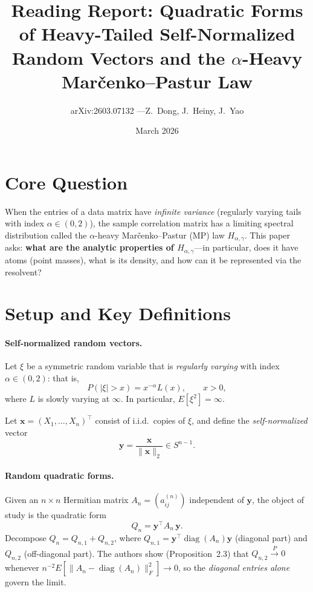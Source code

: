 \documentclass[11pt,a4paper]{article}
\title{Reading Report: Quadratic Forms of Heavy-Tailed Self-Normalized\\
Random Vectors and the $\alpha$-Heavy Mar\v{c}enko--Pastur Law}
\author{arXiv:2603.07132 \quad---\quad Z.~Dong, J.~Heiny, J.~Yao}
\date{March 2026}
\theoremstyle{definition}
\begin{document}
\maketitle

\section{Core Question}
When the entries of a data matrix have \emph{infinite variance} (regularly varying tails with index $\alpha\in(0,2)$), the sample correlation matrix has a limiting spectral distribution called the $\alpha$-heavy Mar\v{c}enko--Pastur (MP) law $H_{\alpha,\gamma}$. This paper asks: \textbf{what are the analytic properties of $H_{\alpha,\gamma}$}---in particular, does it have atoms (point masses), what is its density, and how can it be represented via the resolvent?

\section{Setup and Key Definitions}

\paragraph{Self-normalized random vectors.}
Let $\xi$ be a symmetric random variable that is \emph{regularly varying} with index $\alpha\in(0,2)$: that is,
\[
  P(|\xi|>x) = x^{-\alpha} L(x),\qquad x>0,
\]
where $L$ is slowly varying at $\infty$.  In particular, $E[\xi^2]=\infty$.

Let $\mathbf{x}=(X_1,\dots,X_n)^\top$ consist of i.i.d.\ copies of $\xi$, and define the \emph{self-normalized} vector
\[
  \mathbf{y} = \frac{\mathbf{x}}{\|\mathbf{x}\|_2} \in S^{n-1}.
\]

\paragraph{Random quadratic forms.}
Given an $n\times n$ Hermitian matrix $A_n=(a_{ij}^{(n)})$ independent of $\mathbf{y}$, the object of study is the quadratic form
\[
  Q_n = \mathbf{y}^\top A_n\,\mathbf{y}.
\]
Decompose $Q_n = Q_{n,1}+Q_{n,2}$, where $Q_{n,1}=\mathbf{y}^\top\operatorname{diag}(A_n)\mathbf{y}$ (diagonal part) and $Q_{n,2}$ (off-diagonal part).  The authors show (Proposition~2.3) that $Q_{n,2}\xrightarrow{P}0$ whenever $n^{-2}E[\|A_n-\operatorname{diag}(A_n)\|_F^2]\to 0$, so the \emph{diagonal entries alone} govern the limit.
\end{document}
